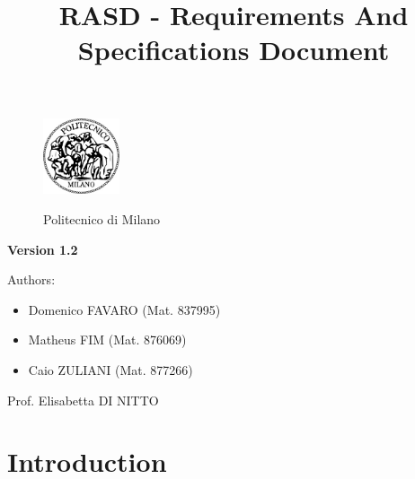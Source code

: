 \documentclass[a4paper]{article}
\title{RASD - Requirements And Specifications Document}
\begin{document}
\begin{titlepage}
\begin{figure}
\centering
\includegraphics[width=0.2\textwidth]{polimi.jpg}
\par
\LARGE Politecnico di Milano
\end{figure}


\maketitle
\textbf{Version 1.2}
\newline

\raggedright
Authors:
\begin{itemize}
	\item Domenico FAVARO (Mat. 837995)
        	\item Matheus FIM (Mat. 876069)
	\item Caio ZULIANI (Mat. 877266)	
\end{itemize}
\raggedleft
Prof. Elisabetta DI NITTO
\thispagestyle{empty}
\end{titlepage}

\tableofcontents
\newpage
 
\section{Introduction}
\end{document}
